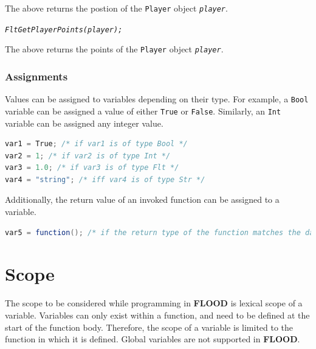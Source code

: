 \documentclass[12pt]{report}
\begin{document}
The above returns the postion of the \texttt{Player} object \textit{\texttt{player}}.

\begin{alltt}\begin{singlespace}
            \textit{Flt GetPlayerPoints(player);}\end{singlespace}
\end{alltt}

The above returns the points of the \texttt{Player} object \textit{\texttt{player}}.

\subsubsection{Assignments}

Values can be assigned to variables depending on their type. For example,  a \texttt{Bool} variable can be assigned a value of either \texttt{True} or \texttt{False}. Similarly, an \texttt{Int} variable can be assigned any integer value. 

\begin{singlespace}
\begin{lstlisting}[language=Java,label=some-code,caption={Assignments}]
var1 = True; /* if var1 is of type Bool */
var2 = 1; /* if var2 is of type Int */
var3 = 1.0; /* if var3 is of type Flt */
var4 = "string"; /* iff var4 is of type Str */
\end{lstlisting}
\end{singlespace}

Additionally, the return value of an invoked function can be assigned to a variable.

\begin{singlespace}
\begin{lstlisting}[language=Java,label=some-code,caption={Function assignment.}]
var5 = function(); /* if the return type of the function matches the data type of var5 */
\end{lstlisting}
\end{singlespace}

\section{Scope}

The scope to be considered while programming in \textbf{FLOOD} is lexical scope of a variable. Variables can only exist within a function, and need to be defined at the start of the function body. Therefore, the scope of a variable is limited to the function in which it is defined. Global variables are not supported in \textbf{FLOOD}.
\end{document}
